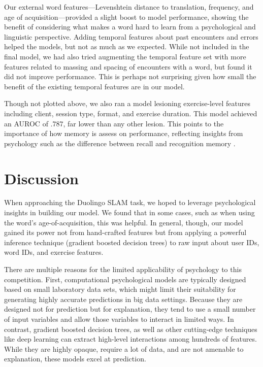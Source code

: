 \documentclass[11pt,a4paper]{article}
\begin{document}
Our external word features---Levenshtein distance to translation, frequency, and
age of acquisition---provided a slight boost to model performance, showing the
benefit of considering what makes a word hard to learn from a psychological and
linguistic perspective. Adding temporal features about past encounters and
errors helped the models, but not as much as we expected. While not included in
the final model, we had also tried augmenting the temporal feature set with more
features related to massing and spacing of encounters with a word, but found it
did not improve performance. This is perhaps not surprising given how small the
benefit of the existing temporal features are in our model.

Though not plotted above, we also ran a model lesioning exercise-level features
including client, session type, format, and exercise duration. This model
achieved an AUROC of $.787$, far lower than any other lesion. This points to the
importance of how memory is assess on performance, reflecting insights
from psychology such as the difference between recall and recognition memory
\cite{yonelinas2002nature}. 

\section{Discussion}

When approaching the Duolingo SLAM task, we hoped to leverage psychological
insights in building our model. We found that in some cases, such as when using the
word's age-of-acquisition, this was helpful. In general, though, our model gained its
power not from hand-crafted features but from applying a powerful inference
technique (gradient boosted decision trees) to raw input about user IDs, word IDs, and
exercise features.

There are multiple reasons for the limited applicability of psychology to this
competition. First, computational psychological models are typically designed based 
on small laboratory data sets, which might limit their suitability for generating highly
accurate predictions in big data settings.
Because they are designed not for prediction but for explanation, they tend to
use a small number of input variables and allow those variables to interact
in limited ways. In contrast, gradient boosted decision trees, as well as other
cutting-edge techniques like deep learning can extract high-level
interactions among hundreds of features. While they are highly opaque, require
a lot of data, and are not amenable to explanation, these models excel at prediction.
\end{document}

